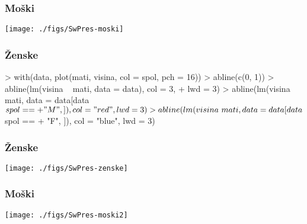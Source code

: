 \begin{frame}[fragile]
\frametitle{Moški}
\texttt{[image: ./figs/SwPres-moski]}
\end{frame}

\begin{frame}[fragile]
\frametitle{Ženske}
\begin{Schunk}
\begin{Sinput}
> with(data, plot(mati, visina, col = spol, pch = 16))
> abline(c(0, 1))
> abline(lm(visina ~ mati, data = data), col = 3, 
+     lwd = 3)
> abline(lm(visina ~ mati, data = data[data$spol == 
+     "M", ]), col = "red", lwd = 3)
> abline(lm(visina ~ mati, data = data[data$spol == 
+     "F", ]), col = "blue", lwd = 3)
\end{Sinput}
\end{Schunk}
\end{frame}

\begin{frame}[fragile]
\frametitle{Ženske}
\texttt{[image: ./figs/SwPres-zenske]}
\end{frame}

\begin{frame}[fragile]
\frametitle{Moški}
\texttt{[image: ./figs/SwPres-moski2]}
\end{frame}




%
%
\clearpage
